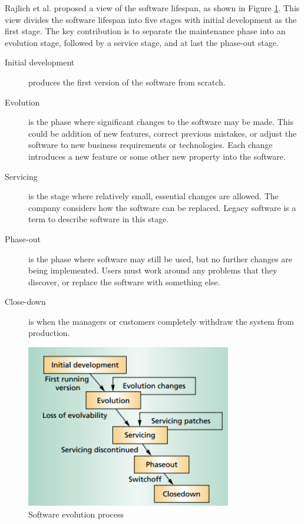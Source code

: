 Rajlich et al.\cite{Bennett:2000:SME:336512.336534} proposed a view of the software lifespan, as shown in Figure \ref{fig:lifespan-1}. This view divides the software lifespan into five stages with initial development as the first stage. The key contribution is to separate the maintenance phase into an evolution stage, followed by a service stage, and at last the phase-out stage.
\begin{description}
	\item[Initial development] produces the first version of the software from scratch.
	\item[Evolution] is the phase where significant changes to the software may be made. This could be addition of new features, correct previous mistakes, or adjust the software to new business requirements or technologies. Each change introduces a new feature or some other new property into the software.
	\item[Servicing] is the stage where relatively small, essential changes are allowed. The company considers how the software can be replaced. Legacy software is a term to describe software in this stage.
	\item[Phase-out] is the phase where software may still be used, but no further changes are being implemented. Users must work around any problems that they discover, or replace the software with something else.
	\item[Close-down] is when the managers or customers completely withdraw the system from production.
\end{description} 

\begin{figure}[ht!]
	\centering
	\includegraphics[width=0.8\textwidth]{images/lifespan-1.png}
	\caption{Software evolution process}
	\label{fig:lifespan-1}
\end{figure}

